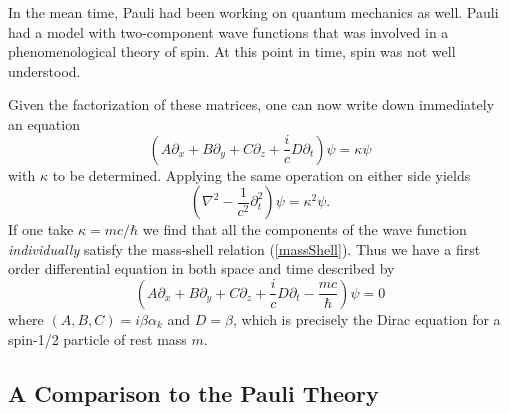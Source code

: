 In the mean time, Pauli had been working on quantum mechanics as well. Pauli had a model with two-component wave functions that was involved in a phenomenological theory of spin. At this point in time, spin was not well understood. 

Given the factorization of these matrices, one can now write down immediately an equation
\begin{equation}
(A\partial_x + B\partial_y + C\partial_z + \frac{i}{c}D\partial_t)\psi = \kappa\psi
\end{equation}
with $\kappa$ to be determined. Applying the same operation on either side yields
\begin{equation}
(\nabla^2 - \frac{1}{c^2}\partial_{t}^2)\psi = \kappa^2\psi.
\end{equation}
If one take $\kappa = mc/\hbar$ we find that all the components of the wave function \emph{individually} satisfy the mass-shell relation (\ref{massShell}). Thus we have a first order differential equation in both space and time described by
\begin{equation}
(A\partial_x + B\partial_y + C\partial_z + \frac{i}{c}D\partial_t - \frac{mc}{\hbar})\psi = 0
\end{equation}
where $(A,B,C)=i\beta\alpha_k$ and $D=\beta$, which is precisely the Dirac equation for a spin-1/2 particle of rest mass $m$.



\subsection{A Comparison to the Pauli Theory}

